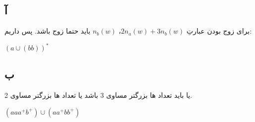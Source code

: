 \documentclass{article}
\begin{document}
\subsection{آ}
برای زوج بودن عبارتِ $2n_a\left( w \right) + 3n_b\left( w \right)$، $n_b\left( w \right)$ باید حتما زوج باشد. پس داریم:
\begin{latin}
$
\left( a \cup \left( bb \right) \right) ^ *
$
\end{latin}

\subsection{ب}
یا باید تعداد ها بزرگتر مساوی 3 باشد یا تعداد ها بزرگتر مساوی 2.
\begin{latin}
$
\left( aaa ^ + b ^ + \right) \cup \left( aa ^ + bb ^ + \right)
$
\end{latin}
\end{document}
